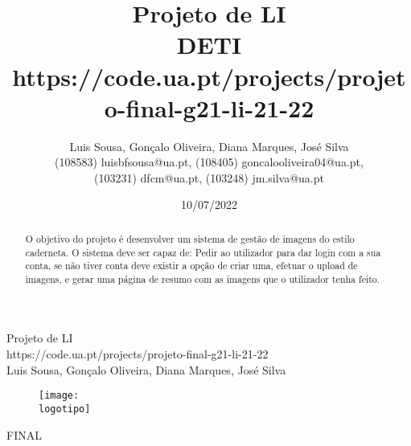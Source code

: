 \documentclass{report}
\begin{document}
%
\def\titulo{Projeto de LI}
\def\data{10/07/2022}
\def\autores{Luis Sousa, Gonçalo Oliveira, Diana Marques, José Silva}
\def\autorescontactos{(108583) luisbfsousa@ua.pt, (108405) goncalooliveira04@ua.pt, 
\\(103231) dfcm@ua.pt, (103248) jm.silva@ua.pt}
\def\versao{FINAL}
\def\departamento{DETI}
\def\empresa{https://code.ua.pt/projects/projeto-final-g21-li-21-22}
\def\logotipo{ua.pdf}
%
%
\begin{titlepage}

\begin{center}
%
\vspace*{50mm}
%
{\Huge \titulo}\\ 
%
\vspace{10mm}
%
{\Large \empresa}\\
%
\vspace{10mm}
%
{\LARGE \autores}\\ 
%
\vspace{30mm}
%
\begin{figure}[h]
\center
\texttt{[image: \\logotipo]}
\end{figure}
%
\vspace{30mm}
\end{center}
%
\begin{flushright}
\versao
\end{flushright}
\end{titlepage}

\title{%
{\Huge\textbf{\titulo}}\\
{\Large \departamento\\ \empresa}
}
%
\author{%
    \autores \\
    \autorescontactos
}
%
\date{\data}
%
\maketitle
%

\begin{abstract}

O objetivo do projeto é desenvolver um sistema de gestão de imagens do estilo caderneta. O sistema deve ser capaz de: Pedir ao utilizador para dar login com a sua conta, se não tiver conta deve existir a opção de criar uma, efetuar o upload de imagens, e gerar uma página de resumo com as imagens que o utilizador tenha feito.

\end{abstract}
\end{document}
